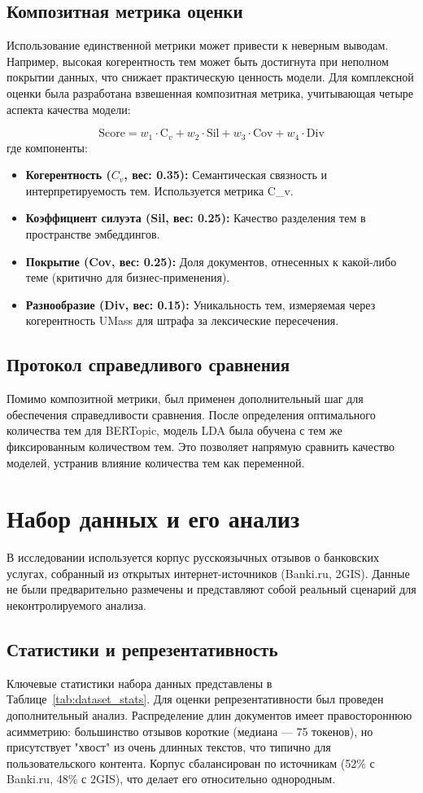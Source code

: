 \documentclass{article}
\begin{document}
\subsection{Композитная метрика оценки}
Использование единственной метрики может привести к неверным выводам. Например, высокая когерентность тем может быть достигнута при неполном покрытии данных, что снижает практическую ценность модели. Для комплексной оценки была разработана взвешенная композитная метрика, учитывающая четыре аспекта качества модели:

$$
\text{Score} = w_1 \cdot \text{C}_{v} + w_2 \cdot \text{Sil} + w_3 \cdot \text{Cov} + w_4 \cdot \text{Div}
$$
где компоненты:
\begin{itemize}
    \item \textbf{Когерентность ($C_v$, вес: 0.35):} Семантическая связность и интерпретируемость тем. Используется метрика C\_v.
    \item \textbf{Коэффициент силуэта (Sil, вес: 0.25):} Качество разделения тем в пространстве эмбеддингов.
    \item \textbf{Покрытие (Cov, вес: 0.25):} Доля документов, отнесенных к какой-либо теме (критично для бизнес-применения).
    \item \textbf{Разнообразие (Div, вес: 0.15):} Уникальность тем, измеряемая через когерентность UMass для штрафа за лексические пересечения.
\end{itemize}

\subsection{Протокол справедливого сравнения}
Помимо композитной метрики, был применен дополнительный шаг для обеспечения справедливости сравнения. После определения оптимального количества тем для BERTopic, модель LDA была обучена с тем же фиксированным количеством тем. Это позволяет напрямую сравнить качество моделей, устранив влияние количества тем как переменной.

\section{Набор данных и его анализ}
В исследовании используется корпус русскоязычных отзывов о банковских услугах, собранный из открытых интернет-источников (Banki.ru, 2GIS). Данные не были предварительно размечены и представляют собой реальный сценарий для неконтролируемого анализа.

\subsection{Статистики и репрезентативность}
Ключевые статистики набора данных представлены в Таблице~\ref{tab:dataset_stats}. Для оценки репрезентативности был проведен дополнительный анализ. Распределение длин документов имеет правостороннюю асимметрию: большинство отзывов короткие (медиана — 75 токенов), но присутствует "хвост" из очень длинных текстов, что типично для пользовательского контента. Корпус сбалансирован по источникам (52\% с Banki.ru, 48\% с 2GIS), что делает его относительно однородным.
\end{document}
